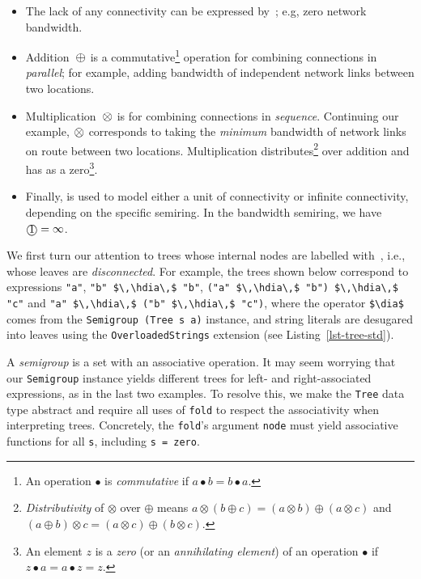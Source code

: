 \documentclass[english,submission]{programming}
\newcommand{\code}[1]{\lstinline[mathescape]|#1|}
\newcommand{\hcode}[1]{{\color{darkblue} \lstinline[keywordstyle={}]|#1|}} %
\newcommand{\hdia}{\,\text{\raisebox{-0.2mm}{\Large\color{darkblue} $\diamond$}}\,}
\newcommand{\add}{\text{\raisebox{-0.1mm}{\large $\oplus$}}}
\newcommand{\mul}{\text{\raisebox{-0.1mm}{\large $\otimes$}}}
\newcommand{\zero}{\raisebox{-0.2mm}{\textcircled{0}}\xspace}
\newcommand{\one}{\raisebox{-0.2mm}{\textcircled{1}}\xspace}
\newcommand{\dia}{\,\text{\raisebox{-0.3mm}{\Large $\diamond$}}\,}
\begin{document}
\vspace{-1mm}
\begin{itemize}
  \item The lack of any connectivity can be expressed by~\zero; e.g, zero
        network bandwidth.
  \item Addition~$\add$ is a commutative\footnote{
            An operation $\bullet$ is \emph{commutative} if
            $a \bullet b = b \bullet a$.
        } operation for combining connections in \emph{parallel}; for example,
        adding bandwidth of independent network links between two locations.
  \item Multiplication~$\mul$ is for combining connections in \emph{sequence}.
        Continuing our example, $\mul$ corresponds to taking the \emph{minimum}
        bandwidth of network links on route between two locations.
        Multiplication distributes\footnote{
            \emph{Distributivity} of $\otimes$ over $\oplus$ means
            $a \otimes (b \oplus c) = (a \otimes b) \oplus (a \otimes c)$ and
            $(a \oplus b) \otimes c = (a \otimes c) \oplus (b \otimes c)$.
        } over addition and has \zero as a zero\footnote{
            An element $z$ is a \emph{zero} (or an \emph{annihilating element})
            of an operation $\bullet$ if $z \bullet a = a \bullet z = z$.
        }.
  \item Finally, \one is used to model either a unit of connectivity or infinite
        connectivity, depending on the specific semiring. In the bandwidth
        semiring, we have $\text{\one} = \infty$.
\end{itemize}

\noindent
We first turn our attention to trees whose internal nodes are labelled
with~\zero, i.e., whose leaves are \emph{disconnected}. For example, the trees
shown below correspond to expressions \code{"a"}, \code{"b" $\,\hdia\,$ "b"},
\code{("a" $\,\hdia\,$ "b") $\,\hdia\,$ "c"} and
\code{"a" $\,\hdia\,$ ("b" $\,\hdia\,$ "c")}, where the operator \code{$\dia$}
comes from the \code{Semigroup (Tree s a)} instance, and string literals are
desugared into leaves using the \code{OverloadedStrings} extension
(see Listing~\ref{lst-tree-std}).

\vspace{2.2mm}
\hfill\hfill
\vspace{2.3mm}

\noindent
A \emph{semigroup} is a set with an associative operation. It may seem worrying
that our \code{Semigroup} instance yields different trees for left- and
right-associated expressions, as in the last two examples. To resolve this, we
make the \code{Tree} data type abstract and require all uses of \hcode{fold} to
respect the associativity when interpreting trees. Concretely, the
\hcode{fold}'s argument \hcode{node} must yield associative functions for all
\hcode{s}, including \hcode{s = zero}.
\end{document}
